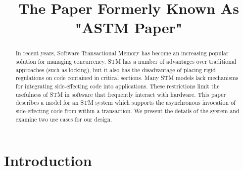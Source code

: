 \documentclass[conference]{IEEEtran}
\begin{document}
\title{The Paper Formerly Known As "ASTM Paper"}

\author{
}

\maketitle


\begin{abstract}
In recent years, Software Transactional Memory has become an increasing popular solution for managing concurrency. STM has a number of advantages over traditional approaches (such as locking), but it also has the disadvantage of placing rigid regulations on code contained in critical sections. Many STM models lack mechanisms for integrating side-effecting code into applications. These restrictions limit the usefulness of STM in software that frequently interact with hardware. This paper describes a model for an STM system which supports the asynchronous invocation of side-effecting code from within a transaction. We present the details of the system and examine two use cases for our design.
\end{abstract}



\IEEEpeerreviewmaketitle


\section{Introduction}

\end{document}
